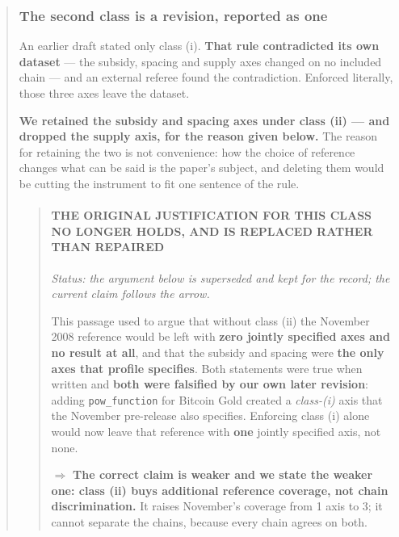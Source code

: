 \documentclass[
]{article}
\newcounter{none} %
\begin{document}
\begin{quote}
\mbox{}%
\subsubsection{The second class is a revision, reported as
one}\label{the-second-class-is-a-revision-reported-as-one}

An earlier draft stated only class (i). \textbf{That rule contradicted
its own dataset} --- the subsidy, spacing and supply axes changed on no
included chain --- and an external referee found the contradiction.
Enforced literally, those three axes leave the dataset.

\textbf{We retained the subsidy and spacing axes under class (ii) ---
and dropped the supply axis, for the reason given below.} The reason for
retaining the two is not convenience: how the choice of reference
changes what can be said is the paper's subject, and deleting them would
be cutting the instrument to fit one sentence of the rule.

\begin{quote}
\mbox{}%
\paragraph{THE ORIGINAL JUSTIFICATION FOR THIS CLASS NO LONGER HOLDS,
AND IS REPLACED RATHER THAN
REPAIRED}\label{the-original-justification-for-this-class-no-longer-holds-and-is-replaced-rather-than-repaired}

\emph{Status: the argument below is superseded and kept for the record;
the current claim follows the arrow.}

This passage used to argue that without class (ii) the November 2008
reference would be left with \textbf{zero jointly specified axes and no
result at all}, and that the subsidy and spacing were \textbf{the only
axes that profile specifies}. Both statements were true when written and
\textbf{both were falsified by our own later revision}: adding
\texttt{pow\_function} for Bitcoin Gold created a \emph{class-(i)} axis
that the November pre-release also specifies. Enforcing class (i) alone
would now leave that reference with \textbf{one} jointly specified axis,
not none.

\(\Rightarrow\) \textbf{The correct claim is weaker and we state the
weaker one: class (ii) buys additional reference coverage, not chain
discrimination.} It raises November's coverage from 1 axis to 3; it
cannot separate the chains, because every chain agrees on both.


\end{quote}
\end{quote}
\end{document}
